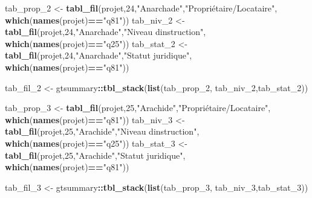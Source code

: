 \documentclass[
]{article}
\newenvironment{Shaded}{\begin{snugshade}}{\end{snugshade}}
\newcommand{\DecValTok}[1]{\textcolor[rgb]{0.00,0.00,0.81}{#1}}
\newcommand{\FunctionTok}[1]{\textcolor[rgb]{0.13,0.29,0.53}{\textbf{#1}}}
\newcommand{\NormalTok}[1]{#1}
\newcommand{\OtherTok}[1]{\textcolor[rgb]{0.56,0.35,0.01}{#1}}
\newcommand{\SpecialCharTok}[1]{\textcolor[rgb]{0.81,0.36,0.00}{\textbf{#1}}}
\newcommand{\StringTok}[1]{\textcolor[rgb]{0.31,0.60,0.02}{#1}}
\begin{document}
\begin{Shaded}
\begin{Highlighting}[]
\NormalTok{tab\_prop\_2 }\OtherTok{\textless{}{-}} \FunctionTok{tabl\_fil}\NormalTok{(projet,}\DecValTok{24}\NormalTok{,}\StringTok{"Anarchade"}\NormalTok{,}\StringTok{"Propriétaire/Locataire"}\NormalTok{,}
                       \FunctionTok{which}\NormalTok{(}\FunctionTok{names}\NormalTok{(projet)}\SpecialCharTok{==}\StringTok{"q81"}\NormalTok{))}
\NormalTok{tab\_niv\_2 }\OtherTok{\textless{}{-}} \FunctionTok{tabl\_fil}\NormalTok{(projet,}\DecValTok{24}\NormalTok{,}\StringTok{"Anarchade"}\NormalTok{,}\StringTok{"Niveau d\textquotesingle{}instruction"}\NormalTok{,}
                      \FunctionTok{which}\NormalTok{(}\FunctionTok{names}\NormalTok{(projet)}\SpecialCharTok{==}\StringTok{"q25"}\NormalTok{))}
\NormalTok{tab\_stat\_2 }\OtherTok{\textless{}{-}} \FunctionTok{tabl\_fil}\NormalTok{(projet,}\DecValTok{24}\NormalTok{,}\StringTok{"Anarchade"}\NormalTok{,}\StringTok{"Statut juridique"}\NormalTok{,}
                       \FunctionTok{which}\NormalTok{(}\FunctionTok{names}\NormalTok{(projet)}\SpecialCharTok{==}\StringTok{"q81"}\NormalTok{))}

\NormalTok{tab\_fil\_2 }\OtherTok{\textless{}{-}}\NormalTok{ gtsummary}\SpecialCharTok{::}\FunctionTok{tbl\_stack}\NormalTok{(}\FunctionTok{list}\NormalTok{(tab\_prop\_2, tab\_niv\_2,tab\_stat\_2))}


\NormalTok{tab\_prop\_3 }\OtherTok{\textless{}{-}} \FunctionTok{tabl\_fil}\NormalTok{(projet,}\DecValTok{25}\NormalTok{,}\StringTok{"Arachide"}\NormalTok{,}\StringTok{"Propriétaire/Locataire"}\NormalTok{,}
                       \FunctionTok{which}\NormalTok{(}\FunctionTok{names}\NormalTok{(projet)}\SpecialCharTok{==}\StringTok{"q81"}\NormalTok{))}
\NormalTok{tab\_niv\_3 }\OtherTok{\textless{}{-}} \FunctionTok{tabl\_fil}\NormalTok{(projet,}\DecValTok{25}\NormalTok{,}\StringTok{"Arachide"}\NormalTok{,}\StringTok{"Niveau d\textquotesingle{}instruction"}\NormalTok{,}
                      \FunctionTok{which}\NormalTok{(}\FunctionTok{names}\NormalTok{(projet)}\SpecialCharTok{==}\StringTok{"q25"}\NormalTok{))}
\NormalTok{tab\_stat\_3 }\OtherTok{\textless{}{-}} \FunctionTok{tabl\_fil}\NormalTok{(projet,}\DecValTok{25}\NormalTok{,}\StringTok{"Arachide"}\NormalTok{,}\StringTok{"Statut juridique"}\NormalTok{,}
                       \FunctionTok{which}\NormalTok{(}\FunctionTok{names}\NormalTok{(projet)}\SpecialCharTok{==}\StringTok{"q81"}\NormalTok{))}

\NormalTok{tab\_fil\_3 }\OtherTok{\textless{}{-}}\NormalTok{ gtsummary}\SpecialCharTok{::}\FunctionTok{tbl\_stack}\NormalTok{(}\FunctionTok{list}\NormalTok{(tab\_prop\_3, tab\_niv\_3,tab\_stat\_3))}


\end{Highlighting}
\end{Shaded}
\end{document}
